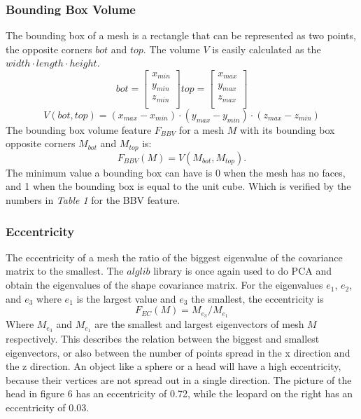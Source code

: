 \documentclass{bigdata}
\begin{document}
\subsubsection{Bounding Box Volume}
The bounding box of a mesh is a rectangle that can be represented as two points, the opposite corners $bot$ and $top$. The volume $V$ is easily calculated as the $width \cdot length \cdot height$.
\[
bot =
\begin{bmatrix}
x_{min} \\
y_{min} \\
z_{min} \\
\end{bmatrix}
top =
\begin{bmatrix}
x_{max} \\
y_{max} \\
z_{max} \\
\end{bmatrix}
\]
\begin{equation}
V(bot,top) = (x_{max} - x_{min}) \cdot (y_{max}-y_{min}) \cdot (z_{max}-z_{min})
\end{equation}
The bounding box volume feature $F_{BBV}$ for a mesh $M$ with its bounding box opposite corners $M_{bot}$ and $M_{top}$ is:
\begin{equation}
F_{BBV}(M) = V(M_{bot},M_{top}).
\end{equation}
The minimum value a bounding box can have is 0 when the mesh has no faces, and 1 when the bounding box is equal to the unit cube. Which is verified by the numbers in \textit{Table 1} for the BBV feature. 

\subsubsection{Eccentricity}
The eccentricity of a mesh the ratio of the biggest eigenvalue of the covariance matrix to the smallest. The $alglib$ library is once again used to do PCA and obtain the eigenvalues of the shape covariance matrix. For the eigenvalues $e_1$, $e_2$, and $e_3$ where $e_1$ is the largest value and $e_3$ the smallest, the eccentricity is
\begin{equation}
F_{EC}(M) = M_{e_3} / M_{e_1}
\end{equation}
Where $M_{e_3}$ and $M_{e_1}$ are the smallest and largest eigenvectors of mesh $M$ respectively. This describes the relation between the biggest and smallest eigenvectors, or also between the number of points spread in the x direction and the z direction. An object like a sphere or a head will have a high eccentricity, because their vertices are not spread out in a single direction. The picture of the head in figure 6 has an eccentricity of 0.72, while the leopard on the right has an eccentricity of 0.03.
\end{document}
